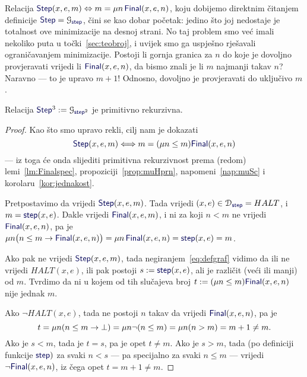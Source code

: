 Relacija $\f{Step}(x,e,m)\Leftrightarrow m= \mu n\,\f{Final}(x,e,n)$, koju dobijemo direktnim čitanjem definicije $\f{Step}=\graf{\f{step}}$, čini se kao dobar početak: jedino što joj nedostaje je totalnost ove minimizacije na desnoj strani. No taj problem smo već imali nekoliko puta u točki~\ref{sec:teobroj}, i uvijek smo ga uspješno rješavali ograničavanjem minimizacije. Postoji li gornja granica za $n$ do koje je dovoljno provjeravati vrijedi li $\f{Final}(x,e,n)$, da bismo znali je li $m$ najmanji takav $n$? Naravno --- to je upravo $m+1$! Odnosno, dovoljno je provjeravati do uključivo $m$.

\begin{lema}[{name=[primitivna rekurzivnost grafa brojenja koraka do zaustavljanja]}]
Relacija $\f{Step}^3:=\graf{\f{step}^2}$ je primitivno rekurzivna.
\end{lema}
\begin{proof}
Kao što smo upravo rekli, cilj nam je dokazati
\begin{equation}
    \f{Step}(x,e,m)\Longleftrightarrow m=(\mu n\le m)\f{Final}(x,e,n)
\end{equation}
--- iz toga će onda slijediti primitivna rekurzivnost prema (redom) lemi~\ref{lm:Finalspec}, propoziciji~\ref{prop:muHprn}, napomeni~\ref{nap:muSc} i korolaru~\ref{kor:jednakost}.

Pretpostavimo da vrijedi $\f{Step}(x,e,m)$. Tada vrijedi $(x,e)\in\dom{\f{step}}=HALT$, i $m=\f{step}(x,e)$. Dakle vrijedi $\f{Final}(x,e,m)$, i ni za koji $n<m$ ne vrijedi $\f{Final}(x,e,n)$, pa je $\mu n\bigl(n\le m\to\f{Final}(x,e,n)\bigr)=\mu n\,\f{Final}(x,e,n)=\f{step}(x,e)=m$.

Ako pak ne vrijedi $\f{Step}(x,e,m)$, tada negiranjem~\eqref{eq:defgraf} vidimo da ili ne vrijedi $HALT(x,e)$, ili pak postoji $s:=\f{step}(x,e)$, ali je različit (veći ili manji) od $m$. Tvrdimo da ni u kojem od tih slučajeva broj $t:=(\mu n\le m)\f{Final}(x,e,n)$ nije jednak $m$.

Ako $\lnot HALT(x,e)$, tada ne postoji $n$ takav da vrijedi $\f{Final}(x,e,n)$, pa je
\begin{equation}
    t = \mu n(n\le m\to\bot)=\mu n\lnot(n\le m)=\mu n(n>m)= m+1\ne m\text.
\end{equation}
Ako je $s<m$, tada je $t=s$, pa je opet $t\ne m$. Ako je $s>m$, tada (po definiciji funkcije $\f{step})$ za svaki $n<s$ --- pa specijalno za svaki $n\le m$ --- vrijedi $\lnot\f{Final}(x,e,n)$, iz čega opet $t=m+1\ne m$.
\end{proof}

